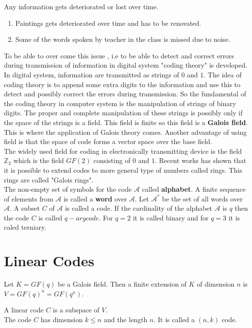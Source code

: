 Any information gets deteriorated or lost over time. 

\begin{enumerate}
\item Paintings gets deteriorated over time and has to be renovated. 
\item Some of the words spoken by teacher in the class is missed due to noise. 
\end{enumerate}

To be able to over come this issue , i.e to be able to detect and correct errors during transmission of information in digital system "coding theory" is developed.
In digital system, information are transmitted as strings of \(0\) and \(1\). The idea of coding theory is to append some extra digits to the information and use this to detect and possibly correct the errors during transmission.
So the fundamental of the coding theory in computer system is the manipulation of strings of binary digits. The proper and complete manipulation of these strings is possibly only if the space of the strings is a field. This field is finite so this field is a \textbf{Galois field}. This is where the application of Galois theory comes.
Another advantage of using field is that the space of code forms a vector space over the base field. \\
The widely used field for coding in electronically transmitting device is the field \({\mathbb{Z}}_2\) which is the field \(GF(2)\) consisting of \(0\) and \(1\). Recent works has shown that it is possible to extend codes to more general type of numbers called rings. This rings are called "Galois rings".\\

The non-empty set of symbols for the code \(\mathcal{A}\) called \textbf{alphabet}. A finite sequence of elements from \(\mathcal{A}\) is called a \textbf{word} over \(\mathcal{A}\). Let \(\mathcal{A}^*\) be the set of all words over \(\mathcal{A}\). A subset \(C\) of \(\mathcal{A}\) is called a code. 
If the cardinality of the alphabet \(\mathcal{A}\) is \(q\) then the code \(C\) is called \(q-ary code\). For \(q=2\) it is called binary and for \(q=3\) it is caled terniary.

\section{Linear Codes}
Let \(K=GF(q)\) be a Galois field. Then a finite extension of \(K\) of dimension \(n\) is \(V=GF(q)^n=GF(q^n)\).
\begin{definition}
    A linear code \(C\) is a subspace of \(V\). \\
    The code \(C\) has dimension \(k \leq n\) and the length \(n\). It is called a \((n,k)\) code.
\end{definition}


